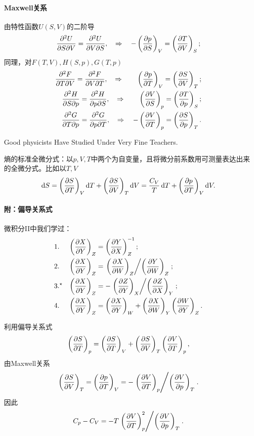 \paragraph*{Maxwell关系}由特性函数$U(S,V)$的二阶导
\begin{align}
	\pw USV=\pw UVS,\thus-\kh{\pv pS}_V=\kh{\pv TV}_S;
\end{align}
同理，对$F(T,V),H(S,p),G(T,p)$
\begin{align}
	\pw FTV=\pw FVT,\thus\quad\kh{\pv pT}_V=\kh{\pv SV}_T; \\
	\pw HSp=\pw HpS,\thus\quad\kh{\pv VS}_p=\kh{\pv Tp}_S; \\
	\pw GTp=\pw GpT,\thus-\kh{\pv VT}_p=\kh{\pv Sp}_T.
\end{align}
\begin{center}
	\tikzchap Good physicists Have Studied Under Very Fine Teachers.
\end{center}
熵的标准全微分式：以$p,V,T$中两个为自变量，且将微分前系数用可测量表达出来的全微分式。比如以$T,V$
\[\d S=\kh{\pv ST}_V\d T+\kh{\pv SV}_T\d V=\frac{C_V}T\d T+\kh{\pv pT}_V\d V.\]
\paragraph*{附：偏导关系式}
微积分II中我们学过：
\begin{align}
	 & 1.       & \kh{\pv XY}_Z & =\kh{\pv YX}_Z^{-1};                                             \\
	 & 2.       & \kh{\pv XY}_Z & =\dvd{\kh{\pv XW}_Z}{\kh{\pv YW}_Z};  \\
	 & 3.^\star & \kh{\pv XY}_Z & =-\dvd{\kh{\pv ZY}_X}{\kh{\pv ZX}_Y}; \\
	 & 4.       & \kh{\pv XY}_Z & =\kh{\pv XY}_W+\kh{\pv XW}_Y\kh{\pv WY}_Z.
\end{align}

利用偏导关系式
\begin{align*}
	\kh{\pv ST}_p=\kh{\pv ST}_V+\kh{\pv SV}_T\kh{\pv VT}_p,
\end{align*}
由Maxwell关系
\[\kh{\pv SV}_T=\kh{\pv pT}_V=-\dvd{\kh{\pv VT}_p}{\kh{\pv Vp}_T}.\]
因此
\[C_p-C_V=-T\dvd{\kh{\pv VT}_p^2}{\kh{\pv Vp}_T}.\]

